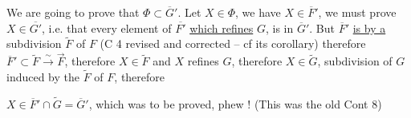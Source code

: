 We are going to prove that $\Phi\subset\overline G'$. Let $X\in\Phi$, we have $X\in\overline F'$,  we must prove $X\in\overline{G'}$, i.e.  that every element of $\overline{F'}$ \uline{which refines} $G$, is in $\overline G'$. But $\overline F'$ \uline{is  by a} subdivision $\widetilde F$ of $F$ (C 4 revised and corrected -- cf its corollary) therefore $\overline F'\subset\widetilde F\xrightarrow{\sim}\overrightarrow F$, therefore $X\in\widetilde F$ and $X$ refines $G$, therefore  $X\in\widetilde G$, subdivision of $G$ induced by the  $\widetilde F$ of $F$, therefore


\deleted{$\Phi$} $X\in\overline F'\cap\widetilde G=\overline G'$, which was to be proved, phew ! (This was the old Cont 8)

